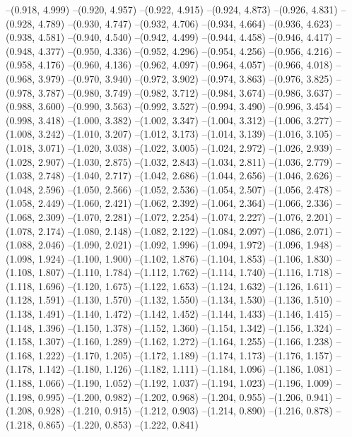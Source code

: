 --(0.918, 4.999)
--(0.920, 4.957)
--(0.922, 4.915)
--(0.924, 4.873)
--(0.926, 4.831)
--(0.928, 4.789)
--(0.930, 4.747)
--(0.932, 4.706)
--(0.934, 4.664)
--(0.936, 4.623)
--(0.938, 4.581)
--(0.940, 4.540)
--(0.942, 4.499)
--(0.944, 4.458)
--(0.946, 4.417)
--(0.948, 4.377)
--(0.950, 4.336)
--(0.952, 4.296)
--(0.954, 4.256)
--(0.956, 4.216)
--(0.958, 4.176)
--(0.960, 4.136)
--(0.962, 4.097)
--(0.964, 4.057)
--(0.966, 4.018)
--(0.968, 3.979)
--(0.970, 3.940)
--(0.972, 3.902)
--(0.974, 3.863)
--(0.976, 3.825)
--(0.978, 3.787)
--(0.980, 3.749)
--(0.982, 3.712)
--(0.984, 3.674)
--(0.986, 3.637)
--(0.988, 3.600)
--(0.990, 3.563)
--(0.992, 3.527)
--(0.994, 3.490)
--(0.996, 3.454)
--(0.998, 3.418)
--(1.000, 3.382)
--(1.002, 3.347)
--(1.004, 3.312)
--(1.006, 3.277)
--(1.008, 3.242)
--(1.010, 3.207)
--(1.012, 3.173)
--(1.014, 3.139)
--(1.016, 3.105)
--(1.018, 3.071)
--(1.020, 3.038)
--(1.022, 3.005)
--(1.024, 2.972)
--(1.026, 2.939)
--(1.028, 2.907)
--(1.030, 2.875)
--(1.032, 2.843)
--(1.034, 2.811)
--(1.036, 2.779)
--(1.038, 2.748)
--(1.040, 2.717)
--(1.042, 2.686)
--(1.044, 2.656)
--(1.046, 2.626)
--(1.048, 2.596)
--(1.050, 2.566)
--(1.052, 2.536)
--(1.054, 2.507)
--(1.056, 2.478)
--(1.058, 2.449)
--(1.060, 2.421)
--(1.062, 2.392)
--(1.064, 2.364)
--(1.066, 2.336)
--(1.068, 2.309)
--(1.070, 2.281)
--(1.072, 2.254)
--(1.074, 2.227)
--(1.076, 2.201)
--(1.078, 2.174)
--(1.080, 2.148)
--(1.082, 2.122)
--(1.084, 2.097)
--(1.086, 2.071)
--(1.088, 2.046)
--(1.090, 2.021)
--(1.092, 1.996)
--(1.094, 1.972)
--(1.096, 1.948)
--(1.098, 1.924)
--(1.100, 1.900)
--(1.102, 1.876)
--(1.104, 1.853)
--(1.106, 1.830)
--(1.108, 1.807)
--(1.110, 1.784)
--(1.112, 1.762)
--(1.114, 1.740)
--(1.116, 1.718)
--(1.118, 1.696)
--(1.120, 1.675)
--(1.122, 1.653)
--(1.124, 1.632)
--(1.126, 1.611)
--(1.128, 1.591)
--(1.130, 1.570)
--(1.132, 1.550)
--(1.134, 1.530)
--(1.136, 1.510)
--(1.138, 1.491)
--(1.140, 1.472)
--(1.142, 1.452)
--(1.144, 1.433)
--(1.146, 1.415)
--(1.148, 1.396)
--(1.150, 1.378)
--(1.152, 1.360)
--(1.154, 1.342)
--(1.156, 1.324)
--(1.158, 1.307)
--(1.160, 1.289)
--(1.162, 1.272)
--(1.164, 1.255)
--(1.166, 1.238)
--(1.168, 1.222)
--(1.170, 1.205)
--(1.172, 1.189)
--(1.174, 1.173)
--(1.176, 1.157)
--(1.178, 1.142)
--(1.180, 1.126)
--(1.182, 1.111)
--(1.184, 1.096)
--(1.186, 1.081)
--(1.188, 1.066)
--(1.190, 1.052)
--(1.192, 1.037)
--(1.194, 1.023)
--(1.196, 1.009)
--(1.198, 0.995)
--(1.200, 0.982)
--(1.202, 0.968)
--(1.204, 0.955)
--(1.206, 0.941)
--(1.208, 0.928)
--(1.210, 0.915)
--(1.212, 0.903)
--(1.214, 0.890)
--(1.216, 0.878)
--(1.218, 0.865)
--(1.220, 0.853)
--(1.222, 0.841)
